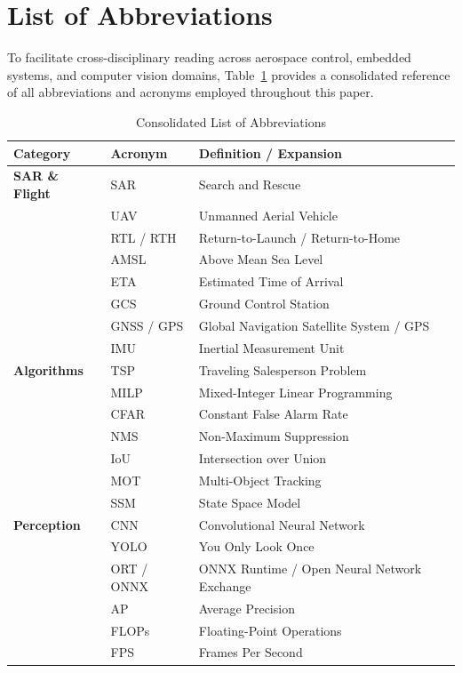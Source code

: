 \section{List of Abbreviations}

To facilitate cross-disciplinary reading across aerospace control, embedded systems, and computer vision domains, Table~\ref{tab:abbreviations} provides a consolidated reference of all abbreviations and acronyms employed throughout this paper.

\begin{table}[htbp]
\caption{Consolidated List of Abbreviations}
\label{tab:abbreviations}
\centering
\scriptsize
\begin{tabularx}{\columnwidth}{@{}llX@{}}
\toprule
\textbf{Category} & \textbf{Acronym} & \textbf{Definition / Expansion} \\
\midrule
\textbf{SAR \& Flight} 
& SAR & Search and Rescue \\
& UAV & Unmanned Aerial Vehicle \\
& RTL / RTH & Return-to-Launch / Return-to-Home \\
& AMSL & Above Mean Sea Level \\
& ETA & Estimated Time of Arrival \\
& GCS & Ground Control Station \\
& GNSS / GPS & Global Navigation Satellite System / GPS \\
& IMU & Inertial Measurement Unit \\
\midrule
\textbf{Algorithms} 
& TSP & Traveling Salesperson Problem \\
& MILP & Mixed-Integer Linear Programming \\
& CFAR & Constant False Alarm Rate \\
& NMS & Non-Maximum Suppression \\
& IoU & Intersection over Union \\
& MOT & Multi-Object Tracking \\
& SSM & State Space Model \\
\midrule
\textbf{Perception} 
& CNN & Convolutional Neural Network \\
& YOLO & You Only Look Once \\
& ORT / ONNX & ONNX Runtime / Open Neural Network Exchange \\
& AP & Average Precision \\
& FLOPs & Floating-Point Operations \\
& FPS & Frames Per Second \\

\end{tabularx}
\end{table}
